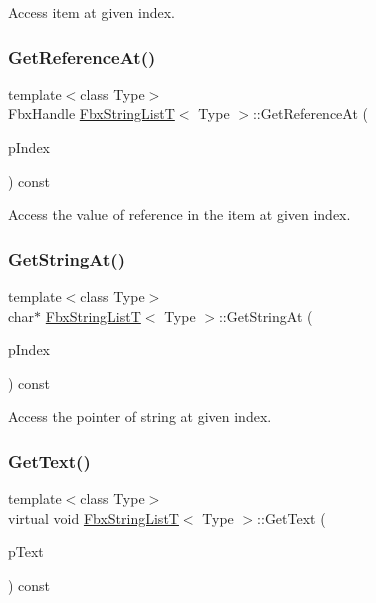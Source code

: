Access item at given index. 

\mbox{\label{class_fbx_string_list_t_ae3987a28b37de829cbf0bed42b5b5091}} 
\subsubsection{\texorpdfstring{Get\+Reference\+At()}{GetReferenceAt()}}
{\footnotesize\ttfamily template$<$class Type$>$ \\
Fbx\+Handle \hyperlink{class_fbx_string_list_t}{Fbx\+String\+ListT}$<$ Type $>$\+::Get\+Reference\+At (\begin{DoxyParamCaption}\item[{int}]{p\+Index }\end{DoxyParamCaption}) const}



Access the value of reference in the item at given index. 

\mbox{\label{class_fbx_string_list_t_a9027620858ce83b4232cca2815b71047}} 
\subsubsection{\texorpdfstring{Get\+String\+At()}{GetStringAt()}}
{\footnotesize\ttfamily template$<$class Type$>$ \\
char$\ast$ \hyperlink{class_fbx_string_list_t}{Fbx\+String\+ListT}$<$ Type $>$\+::Get\+String\+At (\begin{DoxyParamCaption}\item[{int}]{p\+Index }\end{DoxyParamCaption}) const}



Access the pointer of string at given index. 

\mbox{\label{class_fbx_string_list_t_a3b88147898d42dd276a73ff380dbe8d8}} 
\subsubsection{\texorpdfstring{Get\+Text()}{GetText()}}
{\footnotesize\ttfamily template$<$class Type$>$ \\
virtual void \hyperlink{class_fbx_string_list_t}{Fbx\+String\+ListT}$<$ Type $>$\+::Get\+Text (\begin{DoxyParamCaption}\item[{\hyperlink{class_fbx_string}{Fbx\+String} \&}]{p\+Text }\end{DoxyParamCaption}) const\hspace{0.3cm}{\ttfamily [virtual]}}

